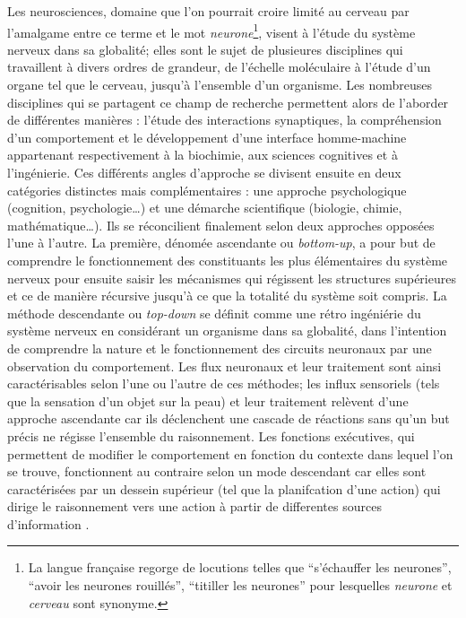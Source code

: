 \documentclass[12pt,fleqn,oneside,openany]{book} %
\begin{document}
Les neurosciences, domaine que l'on pourrait croire limité au cerveau par l'amalgame entre ce terme et le mot \emph{neurone}\footnote{La langue française regorge de locutions telles que ``s'échauffer les neurones'', ``avoir les neurones rouillés'', ``titiller les neurones'' pour lesquelles \emph{neurone} et \emph{cerveau} sont synonyme.}, visent à l'étude du système nerveux dans sa globalité; elles sont le sujet de plusieures disciplines qui travaillent à divers ordres de grandeur, de l'échelle moléculaire à l'étude d'un organe tel que le cerveau, jusqu'à l'ensemble d'un organisme. Les nombreuses disciplines qui se partagent ce champ de recherche permettent alors de l'aborder de différentes manières : l'étude des interactions synaptiques, la compréhension d'un comportement et le développement d'une interface homme-machine appartenant respectivement à la biochimie, aux sciences cognitives et à l'ingénierie. Ces différents angles d'approche se divisent ensuite en deux catégories distinctes mais complémentaires : une approche psychologique (cognition, psychologie…) et une démarche scientifique (biologie, chimie, mathématique…). Ils se réconcilient finalement selon deux approches opposées l'une à l'autre. La première, dénomée ascendante ou \emph{bottom-up}, a pour but de comprendre le fonctionnement des constituants les plus élémentaires du système nerveux pour ensuite saisir les mécanismes qui régissent les structures supérieures et ce de manière récursive jusqu'à ce que la totalité du système soit compris. La méthode descendante ou \emph{top-down} se définit comme une rétro ingéniérie du système nerveux en considérant un organisme dans sa globalité, dans l'intention de comprendre la nature et le fonctionnement des circuits neuronaux par une observation du comportement. Les flux neuronaux et leur traitement sont ainsi caractérisables selon l'une ou l'autre de ces méthodes; les influx sensoriels (tels que la sensation d'un objet sur la peau) et leur traitement relèvent d'une approche ascendante car ils déclenchent une cascade de réactions sans qu'un but précis ne régisse l'ensemble du raisonnement. Les fonctions exécutives, qui permettent de modifier le comportement en fonction du contexte dans lequel l'on se trouve, fonctionnent au contraire selon un mode descendant car elles sont caractérisées par un dessein supérieur (tel que la planifcation d'une action) qui dirige le raisonnement vers une action à partir de differentes sources d'information \cite{bottomupTopdown}\cite{foncExec}.

\begin{figure}[h]
\end{figure}
\end{document}

